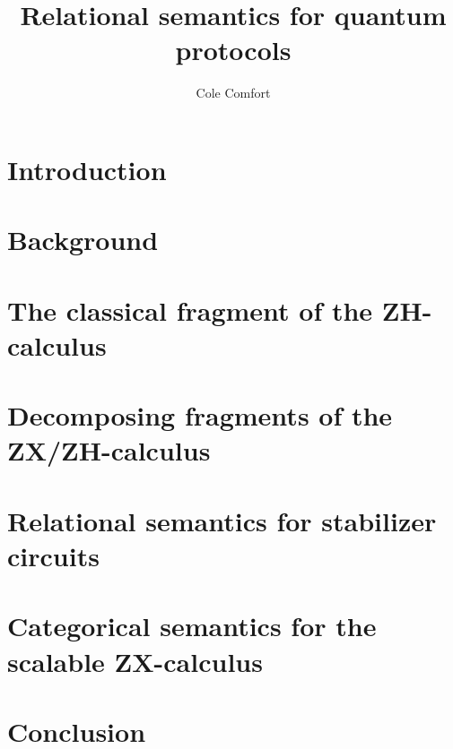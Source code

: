 \documentclass[12pt]{ociamthesis}  %
\title{Relational semantics for quantum protocols}
\author{Cole Comfort}
\begin{document}
\maketitle

\tableofcontents


\chapter{Introduction}


\chapter{Background}
%

\chapter{The classical fragment of the ZH-calculus}
%

\chapter{Decomposing fragments of the ZX/ZH-calculus}
%

\chapter{Relational semantics for stabilizer circuits}


\chapter{Categorical semantics for the scalable ZX-calculus}

\chapter{Conclusion}


 

\end{document}
